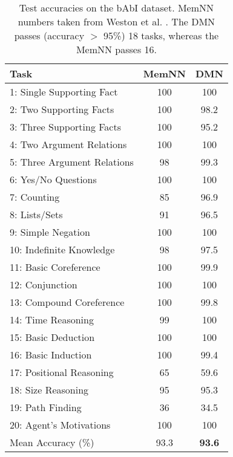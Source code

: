 \documentclass{article}
\begin{document}
\begin{table}[t!]
\begin{center}
\begin{tabular}{l c c } \toprule
    {Task}& {MemNN} & {DMN} \\ \midrule
    1: Single Supporting Fact & 100 & 100  \\
    2: Two Supporting Facts  & {100} & 98.2  \\
    3: Three Supporting Facts  & {100} & 95.2  \\
    4: Two Argument Relations  & 100 & 100  \\ 
    5: Three Argument Relations   & 98 & {99.3} \\
    6: Yes/No Questions  & 100 & 100  \\
    7: Counting  & 85 & {96.9}   \\
    8: Lists/Sets  & 91 & {96.5}  \\ 
    9: Simple Negation  & 100 & 100  \\
    10: Indefinite Knowledge   & 98 & 97.5  \\
    11: Basic Coreference  & 100 & 99.9 \\
    12: Conjunction   & 100 & 100  \\
    13: Compound Coreference   & 100 & 99.8 \\
    14: Time Reasoning   & 99 & 100   \\
    15: Basic Deduction   & 100 & 100 \\
    16: Basic Induction   & 100 & 99.4 \\
    17: Positional Reasoning   & {65} & 59.6 \\
    18: Size Reasoning   & 95 & 95.3 \\
    19: Path Finding   & {36} & 34.5 \\
    20: Agent's Motivations   & 100 & 100 \\
    \midrule
    Mean Accuracy (\%) & 93.3 & \textbf{93.6} \\
    \bottomrule
\end{tabular}
\end{center}
\vspace{-0.3cm}
\caption{Test accuracies on the bAbI dataset. MemNN numbers taken from Weston et al. \cite{Weston2015ToyTasks}. 
The DMN passes (accuracy $>$ 95\%) 18 tasks, whereas the MemNN passes 16.
}
\label{babiresults}
\vspace{-0.3cm}
\end{table}
\end{document}
